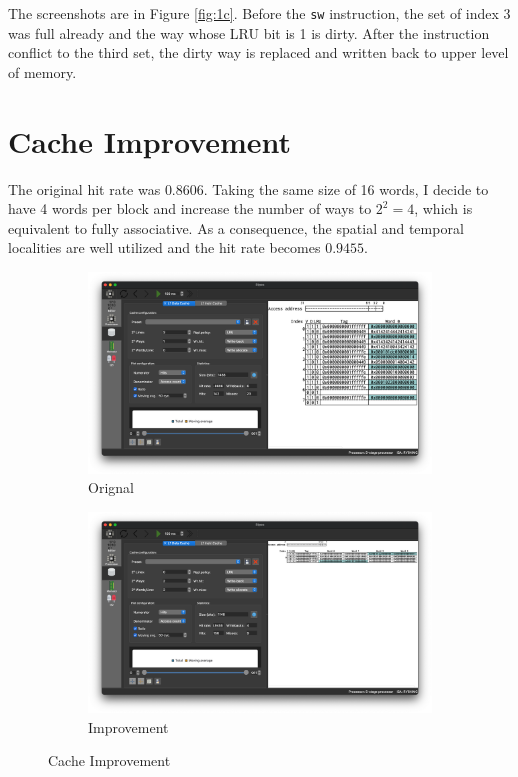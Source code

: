 \documentclass[12pt, a4paper]{article}
\begin{document}
The screenshots are in Figure \ref{fig:1c}. Before the \texttt{sw} instruction, the set of index 3 was full already and the way whose LRU bit is 1 is dirty. After the instruction conflict to the third set, the dirty way is replaced and written back to upper level of memory.

\pagebreak

\section{Cache Improvement}

The original hit rate was $0.8606$. Taking the same size of 16 words, I decide to have 4 words per block and increase the number of ways to $2^2=4$, which is equivalent to fully associative. As a consequence, the spatial and temporal localities are well utilized and the hit rate becomes $0.9455$.

\begin{figure}[htbp]
\begin{subfigure}{\linewidth}
\centering
\includegraphics[width=.8597\linewidth]{2-way}
\caption{Orignal}
\label{fig:2a}
\end{subfigure}
\begin{subfigure}{\linewidth}
\centering
\includegraphics[width=.8597\linewidth]{fully}
\caption{Improvement}
\label{fig:2b}
\end{subfigure}
\caption{Cache Improvement}
\label{fig:2}
\end{figure}
\end{document}
